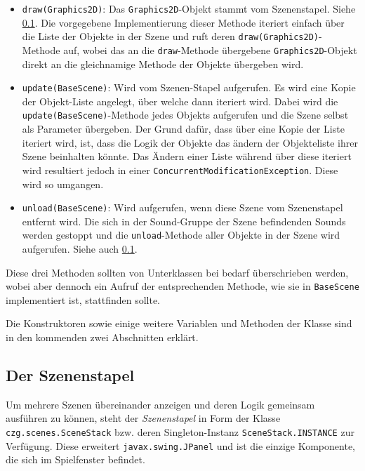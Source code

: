 \begin{sloppypar}
\begin{itemize}
	\item \texttt{draw(Graphics2D)}: Das \texttt{Graphics2D}-Objekt
	      stammt vom Szenenstapel. Siehe \ref{programm:engine:szene:stapel}.
	      Die vorgegebene Implementierung dieser Methode iteriert
	      einfach über die Liste der Objekte in der Szene und ruft deren
	      \texttt{draw(Graphics2D)}-Methode auf, wobei das an die
	      \texttt{draw}-Methode übergebene \texttt{Graphics2D}-Objekt
	      direkt an die gleichnamige Methode der Objekte übergeben wird.
	\item \texttt{update(BaseScene)}: Wird vom Szenen-Stapel aufgerufen.
		  Es wird eine Kopie der Objekt-Liste angelegt, über welche dann
		  iteriert wird. Dabei wird die \texttt{update(BaseScene)}-Methode
		  jedes Objekts aufgerufen und die Szene selbst als Parameter
		  übergeben. Der Grund dafür, dass über eine Kopie der Liste
		  iteriert wird, ist, dass die Logik der Objekte das ändern
		  der Objekteliste ihrer Szene beinhalten könnte. Das Ändern
		  einer Liste während über diese iteriert wird resultiert
		  jedoch in einer \texttt{ConcurrentModificationException}.
		  Diese wird so umgangen.
	\item \texttt{unload(BaseScene)}: Wird aufgerufen, wenn diese
	      Szene vom Szenenstapel entfernt wird. Die sich in der Sound-Gruppe
	      der Szene befindenden Sounds werden gestoppt und die
	      \texttt{unload}-Methode aller Objekte in der Szene
	      wird aufgerufen.
	      Siehe auch \ref{programm:engine:szene:stapel}.
\end{itemize}

Diese drei Methoden sollten von Unterklassen bei bedarf überschrieben
werden, wobei aber dennoch ein Aufruf der entsprechenden Methode,
wie sie in \texttt{BaseScene} implementiert ist, stattfinden sollte.

Die Konstruktoren sowie einige weitere Variablen und Methoden
der Klasse sind in den kommenden zwei Abschnitten erklärt.


\subsection{Der Szenenstapel} \label{programm:engine:szene:stapel}

Um mehrere Szenen übereinander anzeigen und deren Logik gemeinsam
ausführen zu können, steht der \textit{Szenenstapel} in Form der
Klasse \texttt{czg.scenes.SceneStack} bzw. deren Singleton-Instanz
\texttt{SceneStack.INSTANCE} zur Verfügung. Diese erweitert
\texttt{javax.swing.JPanel} und ist die einzige Komponente, die sich
im Spielfenster befindet.


\end{sloppypar}
